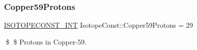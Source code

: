\subsubsection{\texorpdfstring{Copper59\+Protons}{Copper59Protons}}
{\footnotesize\ttfamily \mbox{\hyperlink{group___isotope_const-_macros_ga5f18360b3e99483a35c32d789e62621c}{I\+S\+O\+T\+O\+P\+E\+C\+O\+N\+S\+T\+\_\+\+I\+NT}} Isotope\+Const\+::\+Copper59\+Protons = 29}

\$ \$ Protons in Copper-\/59. 